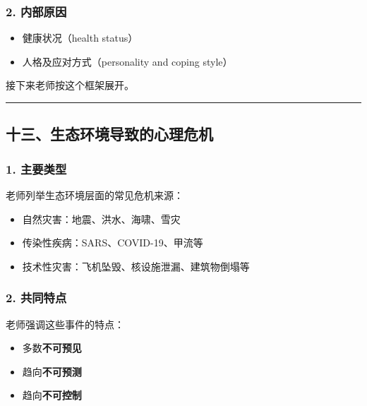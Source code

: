 \documentclass[
  chinese,
  9pt,
  a4paper,
]{ctexart}
\providecommand{\tightlist}{%
  \setlength{\itemsep}{0pt}\setlength{\parskip}{0pt}}
\begin{document}
\subsubsection{2. 内部原因}\label{ux5185ux90e8ux539fux56e0}

\begin{itemize}
\tightlist
\item
  健康状况（health status）
\item
  人格及应对方式（personality and coping style）
\end{itemize}

接下来老师按这个框架展开。

\begin{center}\rule{0.5\linewidth}{0.5pt}\end{center}

\subsection{十三、生态环境导致的心理危机}\label{ux5341ux4e09ux751fux6001ux73afux5883ux5bfcux81f4ux7684ux5fc3ux7406ux5371ux673a}

\subsubsection{1. 主要类型}\label{ux4e3bux8981ux7c7bux578b}

老师列举生态环境层面的常见危机来源：

\begin{itemize}
\tightlist
\item
  自然灾害：地震、洪水、海啸、雪灾
\item
  传染性疾病：SARS、COVID-19、甲流等
\item
  技术性灾害：飞机坠毁、核设施泄漏、建筑物倒塌等
\end{itemize}

\subsubsection{2. 共同特点}\label{ux5171ux540cux7279ux70b9}

老师强调这些事件的特点：

\begin{itemize}
\tightlist
\item
  多数\textbf{不可预见}
\item
  趋向\textbf{不可预测}
\item
  趋向\textbf{不可控制}
\end{itemize}
\end{document}
